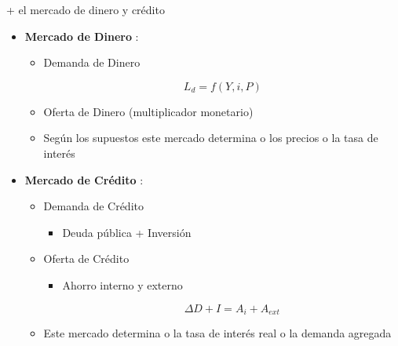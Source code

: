 \documentclass{beamer}
\begin{document}

\begin{frame}{+ el mercado de dinero y crédito}

    \begin{itemize}
        \item \textbf{Mercado de Dinero} \faMoney:
            \begin{itemize}
            \item Demanda de Dinero
            
            \begin{center}
            \begin{tcolorbox}[width=1.5in,
                  interior hidden,
                  boxsep=0pt,
                  left=0pt,
                  right=0pt,
                  top=0pt,
                  ]%
                    $$ L_{d}=f(Y, i, P) $$
             \end{tcolorbox}
             \end{center}
            
            \item Oferta de Dinero (multiplicador monetario)
            \item Según los supuestos este mercado determina o los precios o la tasa de interés
            \end{itemize}
        
        \item \textbf{Mercado de Crédito} \faBank:
            \begin{itemize}
             \item Demanda de Crédito
                \begin{itemize}
                \item Deuda pública + Inversión
                \end{itemize}
              \item Oferta de Crédito
                \begin{itemize}
                \item Ahorro interno y externo

            \begin{center}
            \begin{tcolorbox}[width=2in, boxsep=0pt, left=0pt, right=0pt, top=0pt,]%
                    $$ \Delta D+I=A_{i}+A_{e x t} $$
             \end{tcolorbox}
             \end{center}
                \end{itemize}
            \item Este mercado determina o la tasa de interés real o la demanda agregada
            \end{itemize}
    \end{itemize}

\end{frame}
\end{document}
